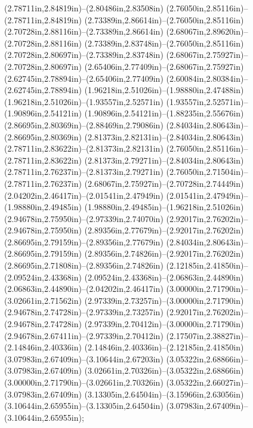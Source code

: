 (2.78711in,2.84819in)--(2.80486in,2.83508in) (2.76050in,2.85116in)--(2.78711in,2.84819in) (2.73389in,2.86614in)--(2.76050in,2.85116in) (2.70728in,2.88116in)--(2.73389in,2.86614in) (2.68067in,2.89620in)--(2.70728in,2.88116in) (2.73389in,2.83748in)--(2.76050in,2.85116in) (2.70728in,2.80697in)--(2.73389in,2.83748in) (2.68067in,2.75927in)--(2.70728in,2.80697in) (2.65406in,2.77409in)--(2.68067in,2.75927in) (2.62745in,2.78894in)--(2.65406in,2.77409in) (2.60084in,2.80384in)--(2.62745in,2.78894in) (1.96218in,2.51026in)--(1.98880in,2.47488in) (1.96218in,2.51026in)--(1.93557in,2.52571in) (1.93557in,2.52571in)--(1.90896in,2.54121in) (1.90896in,2.54121in)--(1.88235in,2.55676in) (2.86695in,2.80369in)--(2.88469in,2.79086in) (2.84034in,2.80643in)--(2.86695in,2.80369in) (2.81373in,2.82131in)--(2.84034in,2.80643in) (2.78711in,2.83622in)--(2.81373in,2.82131in) (2.76050in,2.85116in)--(2.78711in,2.83622in) (2.81373in,2.79271in)--(2.84034in,2.80643in) (2.78711in,2.76237in)--(2.81373in,2.79271in) (2.76050in,2.71504in)--(2.78711in,2.76237in) (2.68067in,2.75927in)--(2.70728in,2.74449in) (2.04202in,2.46417in)--(2.01541in,2.47949in) (2.01541in,2.47949in)--(1.98880in,2.49485in) (1.98880in,2.49485in)--(1.96218in,2.51026in) (2.94678in,2.75950in)--(2.97339in,2.74070in) (2.92017in,2.76202in)--(2.94678in,2.75950in) (2.89356in,2.77679in)--(2.92017in,2.76202in) (2.86695in,2.79159in)--(2.89356in,2.77679in) (2.84034in,2.80643in)--(2.86695in,2.79159in) (2.89356in,2.74826in)--(2.92017in,2.76202in) (2.86695in,2.71808in)--(2.89356in,2.74826in) (2.12185in,2.41850in)--(2.09524in,2.43368in) (2.09524in,2.43368in)--(2.06863in,2.44890in) (2.06863in,2.44890in)--(2.04202in,2.46417in) (3.00000in,2.71790in)--(3.02661in,2.71562in) (2.97339in,2.73257in)--(3.00000in,2.71790in) (2.94678in,2.74728in)--(2.97339in,2.73257in) (2.92017in,2.76202in)--(2.94678in,2.74728in) (2.97339in,2.70412in)--(3.00000in,2.71790in) (2.94678in,2.67411in)--(2.97339in,2.70412in) (2.17507in,2.38827in)--(2.14846in,2.40336in) (2.14846in,2.40336in)--(2.12185in,2.41850in) (3.07983in,2.67409in)--(3.10644in,2.67203in) (3.05322in,2.68866in)--(3.07983in,2.67409in) (3.02661in,2.70326in)--(3.05322in,2.68866in) (3.00000in,2.71790in)--(3.02661in,2.70326in) (3.05322in,2.66027in)--(3.07983in,2.67409in) (3.13305in,2.64504in)--(3.15966in,2.63056in) (3.10644in,2.65955in)--(3.13305in,2.64504in) (3.07983in,2.67409in)--(3.10644in,2.65955in);
